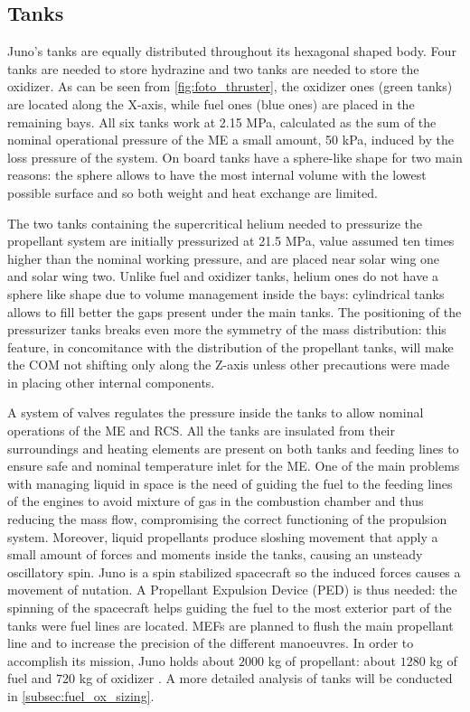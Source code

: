 
\subsection{Tanks} 
\label{subsec:tanks}
Juno's tanks are equally distributed throughout its hexagonal shaped body. Four tanks are needed to store hydrazine and two tanks are needed to store the oxidizer. As can be seen from \autoref{fig:foto_thruster}, the oxidizer ones (green tanks) are located along the X-axis, while fuel ones (blue ones) are placed in the remaining bays. All six tanks work at 2.15 MPa, calculated as the sum of the nominal operational pressure of the ME a small amount, 50 kPa, induced by the loss pressure of the system\cite{Leros}. On board tanks have a sphere-like shape for two main reasons: the sphere allows to have the most internal volume with the lowest possible surface and so both weight and heat exchange are limited.

The two tanks\cite{2tankshe} containing the supercritical helium needed to pressurize the propellant system are initially pressurized at 21.5 MPa, value assumed ten times higher than the nominal working pressure, and are placed near solar wing one and solar wing two. Unlike fuel and oxidizer tanks, helium ones do not have a sphere like shape due to volume management inside the bays\cite{he_tank}: cylindrical tanks allows to fill better the gaps present under the main tanks. The positioning of the pressurizer tanks breaks even more the symmetry of the mass distribution: this feature, in concomitance with the distribution of the propellant tanks, will make the COM not shifting only along the Z-axis unless other precautions were made in placing other internal components. 

A system of valves regulates the pressure inside the tanks to allow nominal operations of the ME and RCS. All the tanks are insulated from their surroundings and heating elements are present on both tanks and feeding lines to ensure safe and nominal temperature inlet for the ME\cite{Leros}.
One of the main problems with managing liquid in space is the need of guiding the fuel to the feeding lines of the engines to avoid mixture of gas in the combustion chamber and thus reducing the mass flow, compromising the correct functioning of the propulsion system. Moreover, liquid propellants produce sloshing movement that apply a small amount of forces and moments inside the tanks, causing an unsteady oscillatory spin. Juno is a spin stabilized spacecraft so the induced forces causes a movement of nutation. A Propellant Expulsion Device (PED) is thus needed: the spinning of the spacecraft helps guiding the fuel to the most exterior part of the tanks were fuel lines are located\cite{slosh}.
MEFs are planned to flush the main propellant line and to increase the precision of the different manoeuvres.
In order to accomplish its mission, Juno holds about $2000$ kg of propellant: about $1280$ kg of fuel and $720$ kg of oxidizer \cite{junno_inner}. A more detailed analysis of tanks will be conducted in \autoref{subsec:fuel_ox_sizing}.